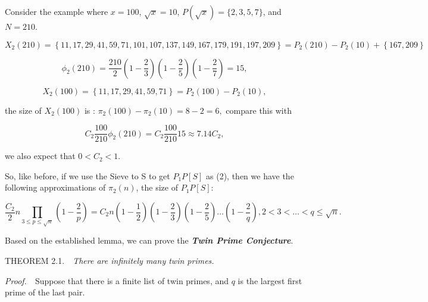 \documentclass{aomart}
\begin{document}
Consider the example where \( x = 100 \), \( \sqrt{x} = 10 \), \( P(\sqrt{x}) = \{2,3,5,7\} \), and \( N = 210 \).

\begin{equation}
X_{2}\left(210\right) =\left\{ 11, 17, 29, 41, 59, 71, 101, 107, 137, 149, 167, 179, 191, 197, 209\right\}  = P_{2}\left(210\right)-P_{2}\left(10\right)+\left\{ 167, 209\right\} 
\end{equation}


\begin{equation}
 \phi_{2}\left(210\right) =\frac{210}{2}\left(1-\frac{2}{3}\right)\left(1-\frac{2}{5}\right)\left(1-\frac{2}{7}\right) = 15 ,  
\end{equation}


\begin{equation}
X_{2}\left(100\right) =\left\{ 11, 17, 29, 41, 59, 71\right\}  = P_{2}\left(100\right)- P_{2}\left(10\right),
\end{equation}


the { size of }\( X_{2}\left(100\right)\) is {:} \( \pi_{2}\left(100\right)-\pi_{2}\left(10\right) = 8-2 = 6,\) compare this with

\begin{equation}
C_{2}\frac{100}{210}  \phi_{2}\left(210\right) = C_{2}\frac{100}{210} 15\approx 7.14C_{2} ,  
\end{equation}


we also expect that \(  0<C_{2}<1\).

\vspace{1\baselineskip}

So, like before, if we use the Sieve to S to get \(  P_{1}P\left[S\right]\) as (2), then we have the following approximations of \( \pi_{2}\left(n\right)\), \( \)the size of \(  P_{1}P\left[S\right]\):

\begin{equation}
\frac{C_{2} }{2}n\prod_{3\leq p\leq\sqrt{n}}^{}\left(1-\frac{2}{p}\right) = C_{2} n\left(1-\frac{1}{2}\right)\left(1-\frac{2}{3}\right)\left(1-\frac{2}{5}\right)\ldots \left(1-\frac{2}{q}\right) ,    2<3<\ldots <q\leq\sqrt{n} .  
\end{equation}


Based on the established lemma, we can prove the \textbf{\textit{Twin Prime Conjecture}}.
\vspace{1\baselineskip}

THEOREM  2.1.\ \ \textit{There are infinitely many twin primes.}

\textit{Proof.}\ \ Suppose that there is a finite list of twin primes, and \( q\) is the largest first prime of the last pair.
\end{document}
